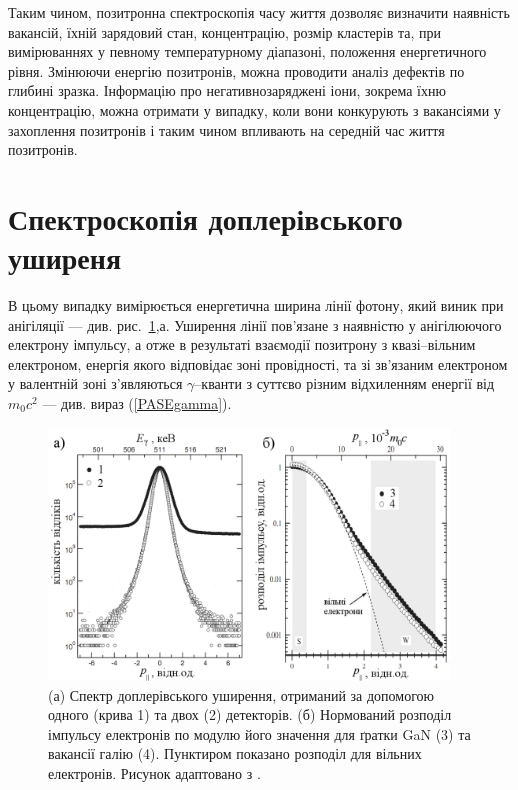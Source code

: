 \documentclass[10pt,a5paper,titlepage,oneside]{book}
\numberwithin{equation}{part}
\begin{document}
Таким чином, позитронна спектроскопія часу життя дозволяє визначити наявність вакансій,
їхній зарядовий стан, концентрацію, розмір кластерів та, при вимірюваннях у певному температурному діапазоні,
положення енергетичного рівня.
Змінюючи енергію позитронів, можна проводити аналіз дефектів по глибині зразка.
Інформацію про негативнозаряджені іони, зокрема їхню концентрацію,
можна отримати у випадку, коли вони конкурують з вакансіями у захоплення позитронів і таким чином впливають на середній час життя позитронів.

\section{Спектроскопія доплерівського уширеня}\label{secPAS_SDU}

В цьому випадку вимірюється енергетична ширина лінії фотону,
який виник при анігіляції --- див. рис.~\ref{F34},а.
Уширення лінії пов'язане з наявністю у анігілюючого електрону імпульсу,
а отже в результаті взаємодії позитрону з квазі--вільним електроном, енергія якого відповідає
зоні провідності, та зі зв'язаним електроном у валентній зоні
з'являються $\gamma$--кванти з суттєво різним відхиленням енергії від $m_0c^2$
--- див. вираз (\ref{PASEgamma}).

\begin{figure}[!t]
\center
\vspace{-5mm}
\includegraphics[width=0.95\textwidth]{Fig3_4}
\vspace{-3mm}
\caption{(а) Спектр доплерівського уширення,
отриманий за допомогою одного (крива 1) та двох (2)
детекторів.
(б) Нормований розподіл імпульсу електронів
по модулю його значення для ґратки GaN (3)
та вакансії галію (4).
Пунктиром показано розподіл для вільних електронів.
Рисунок адаптовано з \cite{PAS}.
}
\vspace{-3mm}
\label{F34}
\end{figure}
\end{document}
